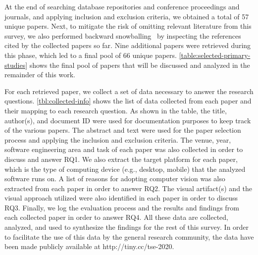At the end of searching database repositories and
conference proceedings and journals,
and applying inclusion and exclusion criteria,
we obtained a total of 57 unique papers.
Next, 
to mitigate the risk of omitting relevant literature from this survey,
we also performed backward snowballing~\cite{Wohlin:2014:GSS:2601248.2601268}
by inspecting the references cited by the collected papers so far.
Nine additional papers were retrieved during this phase,
which led to a final pool of 66 unique papers.
\autoref{table:selected-primary-studies}
shows the final pool of papers
that will be discussed and analyzed in the remainder of this work.



For each retrieved paper,
we collect a set of data necessary to answer the research questions. 
\autoref{tbl:collected-info} shows the list of data
collected from each paper
and their mapping to each research question.
As shown in the table,
the title, author(s), and document ID were used
for documentation purposes to keep track of the various papers.
The abstract and text were used for the paper selection process
and applying the inclusion and exclusion criteria.
The venue, year, software engineering area and task
of each paper was also collected in order to discuss and answer
RQ1. 
We also extract the target platform for each paper, which is  
the type of computing device (e.g., desktop, mobile) that the 
analyzed software runs on.
A list of reasons for adopting computer vision was also 
extracted from each paper in order to answer RQ2.
The visual artifact(s) and the visual approach utilized
were also identified in each paper in order to discuss RQ3.
Finally, we log the evaluation process and the results and findings
from each collected paper in order to answer RQ4.
All these data are collected, analyzed, and used to synthesize 
the findings for the rest of this survey. 
In order to facilitate the use of this data by
the general research community, the data have been 
made publicly available at http://tiny.cc/tse-2020.


